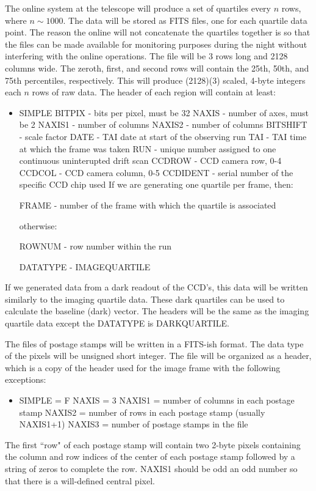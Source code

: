	The online system at the telescope will produce a set of quartiles
every $n$ rows, where $n \sim 1000$.  The data will be stored as FITS files, 
one for each quartile data point.  The reason the online will not concatenate
the quartiles together is so that the files can be made available for
monitoring purposes during the night without interfering with the online
operations.  The file will be 3 rows long and 2128
columns wide.  The zeroth, first, and second rows will contain the
25th, 50th, and 75th percentiles, respectively.  This will produce (2128)(3) 
scaled, 4-byte integers each $n$ rows of raw data.  The header of each 
region will contain at least:
\begin{itemize}
\item SIMPLE
\sitem BITPIX - bits per pixel, must be 32
\sitem NAXIS - number of axes, must be 2
\sitem NAXIS1 - number of columns
\sitem NAXIS2 - number of columns
\sitem BITSHIFT - scale factor
\sitem DATE - TAI date at start of the observing run
\sitem TAI - TAI time at which the frame was taken
\sitem RUN - unique number assigned to one continuous uninterupted drift scan
\sitem CCDROW - CCD camera row, 0-4
\sitem CCDCOL - CCD camera column, 0-5
\sitem CCDIDENT - serial number of the specific CCD chip used
\sitem If we are generating one quartile per frame, then:
\begin{itemize}
\sitem FRAME - number of the frame with which the quartile is associated
\end{itemize}
\sitem otherwise:
\begin{itemize}
\sitem ROWNUM - row number within the run
\end{itemize}
\sitem DATATYPE - IMAGEQUARTILE
\end{itemize}

	If we generated data from a dark readout of the CCD's, this
data will be written similarly to the imaging
quartile data.  These dark quartiles can be used to calculate the baseline
(dark) vector.  The headers will be the same as the imaging quartile data
except the DATATYPE is DARKQUARTILE.

	The files of postage stamps will be written in a FITS-ish format.
The data type of the pixels will be unsigned short integer.  The file
will be organized as a header, which is a copy of the header used for the
image frame with the following exceptions:
\begin{itemize}
\item SIMPLE = F
\sitem NAXIS = 3
\sitem NAXIS1 = number of columns in each postage stamp
\sitem NAXIS2 = number of rows in each postage stamp (usually NAXIS1+1)
\sitem NAXIS3 = number of postage stamps in the file
\end{itemize}
The first ``row" of each postage stamp will contain two 2-byte pixels 
containing the column and
row indices of the center of each postage stamp followed by a string of
zeros to complete the row.  NAXIS1 should
be odd an odd number so that there is a will-defined central pixel.

